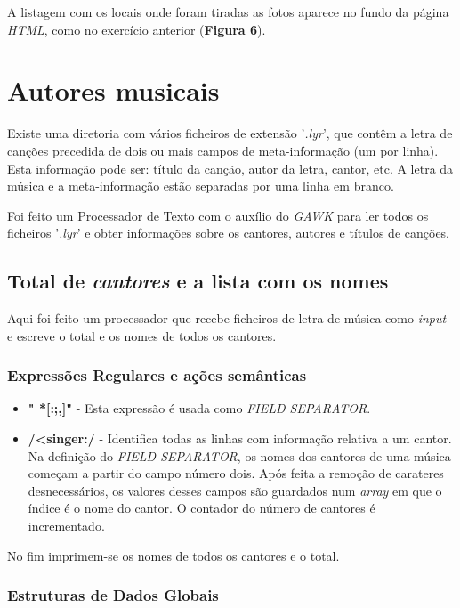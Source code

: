\documentclass{article}
\begin{document}
A listagem com os locais onde foram tiradas as fotos aparece no fundo da página \emph{HTML}, como no exercício anterior (\textbf{Figura 6}).

\newpage
\section{Autores musicais}

Existe uma diretoria com vários ficheiros de extensão '\emph{.lyr}', que contêm a letra de canções precedida de dois ou mais campos de meta-informação (um por linha). Esta informação pode ser: título da canção, autor da letra, cantor, etc. A letra da música e a meta-informação estão separadas por uma linha em branco.

Foi feito um Processador de Texto com o auxílio do \emph{GAWK} para ler todos os ficheiros '\emph{.lyr}' e obter informações sobre os cantores, autores e títulos de canções.

\subsection{Total de \emph{cantores} e a lista com os nomes}

Aqui foi feito um processador que recebe ficheiros de letra de música como \emph{input} e escreve o total e os nomes de todos os cantores.

\subsubsection{Expressões Regulares e ações semânticas}


\begin{itemize}
    \item \textbf{" *[:;,]"} - Esta expressão é usada como \emph{FIELD SEPARATOR}.
    \item \textbf{/\textless singer:/ } - Identifica todas as linhas com informação relativa a um cantor. Na definição do \emph{FIELD SEPARATOR}, os nomes dos cantores de uma música começam a partir do campo número dois. Após feita a remoção de carateres desnecessários, os valores desses campos são guardados num \emph{array} em que o índice é o nome do cantor. O contador do número de cantores é incrementado.
\end{itemize}

No fim imprimem-se os nomes de todos os cantores e o total.

\subsubsection{Estruturas de Dados Globais}
\end{document}
